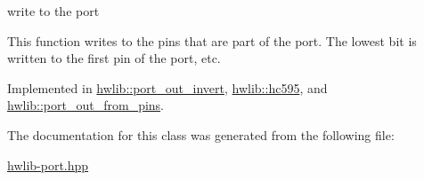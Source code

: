 write to the port 

This function writes to the pins that are part of the port. The lowest bit is written to the first pin of the port, etc. 

Implemented in \hyperlink{classhwlib_1_1port__out__invert_a112ff1c0afec7813ce35830f20a3acb3}{hwlib\+::port\+\_\+out\+\_\+invert}, \hyperlink{classhwlib_1_1hc595_ad2b4d6fa77114f1f13348075389efd1c}{hwlib\+::hc595}, and \hyperlink{classhwlib_1_1port__out__from__pins_aefa5fd9f8d8756fb7c07a89eff03caa4}{hwlib\+::port\+\_\+out\+\_\+from\+\_\+pins}.



The documentation for this class was generated from the following file\+:\begin{DoxyCompactItemize}
\item 
\hyperlink{hwlib-port_8hpp}{hwlib-\/port.\+hpp}\end{DoxyCompactItemize}
